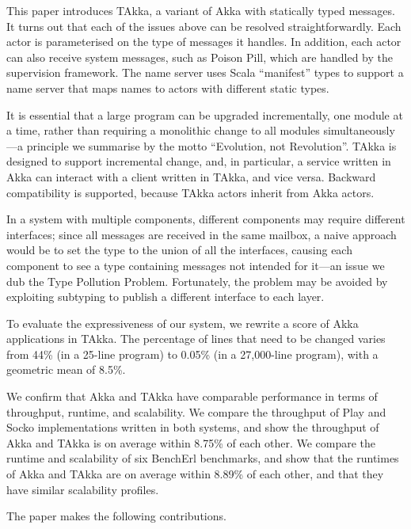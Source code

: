 This paper introduces TAkka, a variant of Akka with statically typed
messages.  It turns out that each of the issues above can be resolved
straightforwardly.  Each actor is parameterised on the type of
messages it handles.  In addition, each actor can also receive system
messages, such as Poison Pill, which are handled by the supervision
framework.  The name server uses Scala ``manifest'' types to support a
name server that maps names to actors with different static types.

It is essential that a large program can be upgraded incrementally,
one module at a time, rather than requiring a monolithic change to 
all modules simultaneously---a principle we summarise by the motto
``Evolution, not Revolution''.  TAkka is designed to support
incremental change, and, in particular, a service written in Akka
can interact with a client written in TAkka, and vice versa.
Backward compatibility is supported, because TAkka actors inherit
from Akka actors.

In a system with multiple components, different components may require
different interfaces; since all messages are received in the same
mailbox, a naive approach would be to set the type to the union of all
the interfaces, causing each component to see a type containing
messages not intended for it---an issue we dub the Type Pollution
Problem.  Fortunately, the problem may be avoided by exploiting
subtyping to publish a different interface to each layer.

To evaluate the expressiveness of our system, we rewrite a score of
Akka applications in TAkka.  The percentage of lines that need to be
changed varies from 44\% (in a 25-line program) to 0.05\% (in a
27,000-line program), with a geometric mean of 8.5\%.

We confirm that Akka and TAkka have comparable performance in terms of
throughput, runtime, and scalability.  We compare the throughput of
Play and Socko implementations written in both systems, and show the
throughput of Akka and TAkka is on average within 8.75\% of each
other.  We compare the runtime and scalability of six BenchErl
benchmarks, and show that the runtimes of Akka and TAkka are on
average within 8.89\% of each other, and that they have similar
scalability profiles.

The paper makes the following contributions.


